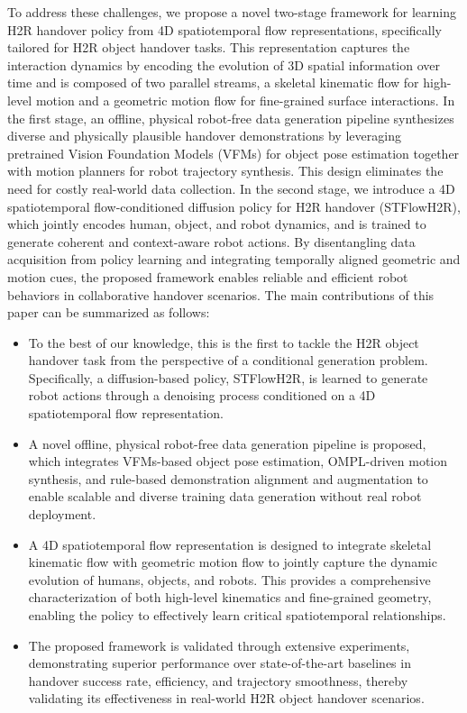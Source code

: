 \documentclass[final,5p,times,twocolumn]{elsarticle}
\begin{document}
To address these challenges, we propose a novel two-stage framework for learning H2R handover policy from 4D spatiotemporal flow representations, specifically tailored for H2R object handover tasks. This representation captures the interaction dynamics by encoding the evolution of 3D spatial information over time and is composed of two parallel streams, a skeletal kinematic flow for high-level motion and a geometric motion flow for fine-grained surface interactions. In the first stage, an offline, physical robot-free data generation pipeline synthesizes diverse and physically plausible handover demonstrations by leveraging pretrained Vision Foundation Models (VFMs) for object pose estimation together with motion planners for robot trajectory synthesis. This design eliminates the need for costly real-world data collection. In the second stage, we introduce a 4D spatiotemporal flow-conditioned diffusion policy for H2R handover (STFlowH2R), which jointly encodes human, object, and robot dynamics, and is trained to generate coherent and context-aware robot actions. By disentangling data acquisition from policy learning and integrating temporally aligned geometric and motion cues, the proposed framework enables reliable and efficient robot behaviors in collaborative handover scenarios. The main contributions of this paper can be summarized as follows:
\begin{itemize}
    \item To the best of our knowledge, this is the first to tackle the H2R object handover task from the perspective of a conditional generation problem. Specifically, a diffusion-based policy, STFlowH2R, is learned to generate robot actions through a denoising process conditioned on a 4D spatiotemporal flow representation.
    \item A novel offline, physical robot-free data generation pipeline is proposed, which integrates VFMs-based object pose estimation, OMPL-driven motion synthesis, and rule-based demonstration alignment and augmentation to enable scalable and diverse training data generation without real robot deployment.
    \item A 4D spatiotemporal flow representation is designed to integrate skeletal kinematic flow with geometric motion flow to jointly capture the dynamic evolution of humans, objects, and robots. This provides a comprehensive characterization of both high-level kinematics and fine-grained geometry, enabling the policy to effectively learn critical spatiotemporal relationships.
    \item The proposed framework is validated through extensive experiments, demonstrating superior performance over state-of-the-art baselines in handover success rate, efficiency, and trajectory smoothness, thereby validating its effectiveness in real-world H2R object handover scenarios.
\end{itemize}
\end{document}
